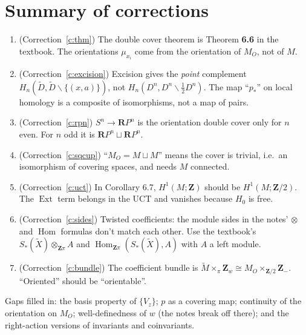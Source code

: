 \documentclass[11pt]{article}
\newcommand{\Z}{\mathbf{Z}}
\newcommand{\RP}{\mathbf{R}P}
\newcommand{\MO}{M_O}
\newcommand{\Mt}{\widetilde{M}}
\newcommand{\Xt}{\widetilde{X}}
\newcommand{\Zpi}{\Z\pi}
\DeclareMathOperator{\Hom}{Hom}
\DeclareMathOperator{\Ext}{Ext}
\newcommand{\minus}{\smallsetminus}
\newcommand{\iso}{\cong}
\theoremstyle{namedit}
\theoremstyle{namedrm}
\begin{document}
\section*{Summary of corrections}
\begin{enumerate}[label=\textbf{\arabic*.}, leftmargin=2em]
  \item (Correction~\ref{c:thm}) The double cover theorem is Theorem \textbf{6.6} in the textbook. The
        orientations $\mu_{x_i}$ come from the orientation of $\MO$, not of $M$.
  \item (Correction~\ref{c:excision}) Excision gives the \emph{point} complement
        $H_n(\widetilde D,\widetilde D\minus\{(x,a)\})$, not $H_n(D^n,D^n\minus\tfrac12D^n)$. The map
        ``$p_*$'' on local homology is a composite of isomorphisms, not a map of pairs.
  \item (Correction~\ref{c:rpn}) $S^n\to\RP^n$ is the orientation double cover only for $n$ even. For $n$
        odd it is $\RP^n\sqcup\RP^n$.
  \item (Correction~\ref{c:sqcup}) ``$\MO=M\sqcup M$'' means the cover is trivial, i.e.\ an isomorphism of
        covering spaces, and needs $M$ connected.
  \item (Correction~\ref{c:uct}) In Corollary 6.7, $H^1(M;\Z)$ should be $H^1(M;\Z/2)$. The $\Ext$ term
        belongs in the UCT and vanishes because $H_0$ is free.
  \item (Correction~\ref{c:sides}) Twisted coefficients: the module sides in the notes' $\otimes$ and $\Hom$
        formulas don't match each other. Use the textbook's $S_*(\Xt)\otimes_{\Zpi}A$ and
        $\Hom_{\Zpi}(S_*(\Xt),A)$ with $A$ a left module.
  \item (Correction~\ref{c:bundle}) The coefficient bundle is $\Mt\times_\pi\Z_w\iso\MO\times_{\Z/2}\Z_-$.
        ``Oriented'' should be ``orientable''.
\end{enumerate}
Gaps filled in: the basis property of $\{V_z\}$; $p$ as a covering map; continuity of the orientation on
$\MO$; well-definedness of $w$ (the notes break off there); and the right-action versions of
invariants and coinvariants.
\end{document}
